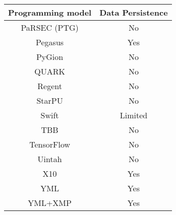 \begin{tabular}{cc}
\hline
Programming model & Data Persistence \\
\hline
PaRSEC (PTG) & No\\
Pegasus & Yes\\
PyGion & No\\
QUARK & No\\
Regent & No\\
StarPU & No\\
Swift & Limited\\
TBB & No\\
TensorFlow & No\\
Uintah & No\\
X10 & Yes\\
YML & Yes\\
YML+XMP & Yes\\
\hline
\end{tabular}
